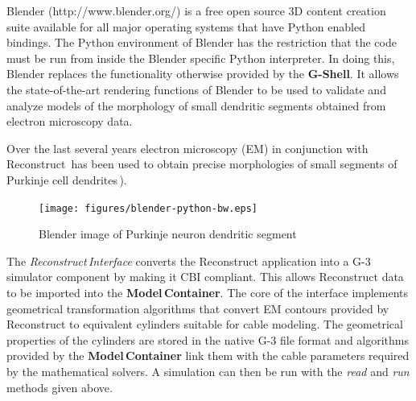 \documentclass[12pt]{article}
\begin{document}
Blender (http://www.blender.org/) is a free open source 3D content
creation suite available for all major operating systems that have
Python enabled bindings.  The Python environment of Blender has the
restriction that the code must be run from inside the Blender specific
Python interpreter. In doing this, Blender replaces the functionality otherwise
provided by the {\bf G-Shell}. It allows the state-of-the-art rendering
functions of Blender to be used to validate and analyze models of the morphology
of small dendritic segments obtained from electron microscopy data.

Over the last several years electron microscopy (EM) in conjunction
with Reconstruct\,\cite{jc05:_recon} has been used to obtain precise
morphologies of small segments of Purkinje cell
dendrites\,\cite{huo09:_purkin, cornelis08:_model_neuros_genes}).

\begin{figure}[ht]
  \centering
    \texttt{[image: figures/blender-python-bw.eps]}
  \caption{Blender image of Purkinje neuron dendritic segment}
  \label{fig:cbi-blender}
\end{figure}


The {\it Reconstruct\,Interface} converts the Reconstruct application
into a G-3 simulator component by making it CBI compliant. This allows
Reconstruct data to be imported into the {\bf Model\,Container}.
The core of the interface implements geometrical transformation
algorithms that convert EM contours provided by Reconstruct to
equivalent cylinders suitable for cable modeling.
The geometrical properties of the cylinders are stored in the native
G-3 file format and algorithms provided by the {\bf Model\,Container}
link them with the cable parameters required by the mathematical
solvers.  A simulation can then be run with the {\it read} and {\it
  run} methods given above.
\end{document}
